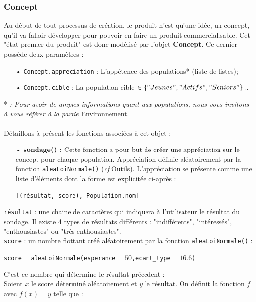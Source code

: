 \subsubsection{Concept}
\noindent
Au début de tout processus de création, le produit n'est qu'une idée, un concept, qu'il va falloir développer pour pouvoir en faire un produit commercialisable. Cet "état premier du produit" est donc modélisé par l'objet \textbf{Concept}. Ce dernier possède deux paramètres : 
	\begin{enumerate}
		\item[•] \texttt{Concept.appreciation} : L'appétence des populations* (liste de listes);
		\item[•] \texttt{Concept.cible} : La population cible $\in \left\{ "Jeunes", "Actifs", "Seniors"\right\}.$.\\ 
	\end{enumerate}
\noindent
* \textit{: Pour avoir de amples informations quant aux populations, nous vous invitons à vous référer à la partie} Environnement.\\\\
\noindent
Détaillons à présent les fonctions associées à cet objet :
\begin{enumerate}
	\item[•] \textbf{sondage() :} Cette fonction a pour but de créer une appréciation sur le concept pour chaque population. Appréciation définie aléatoirement par la fonction \texttt{aleaLoiNormale()} (\textit{cf} Outils). L'appréciation se présente comme une liste d'éléments dont la forme est explicitée ci-après :
	\begin{center}
		\texttt{[(résultat, score), Population.nom]}	
	\end{center}
\end{enumerate}
\noindent
\texttt{résultat} : une chaine de caractères qui indiquera à l'utilisateur le résultat du sondage. Il existe 4 types de résultats différents : "indifférents", "intéressés", "enthousiastes" ou "très enthousiastes".\\
\texttt{score} : un nombre flottant créé aléatoirement par la fonction \texttt{aleaLoiNormale()} :\\
\begin{center}
\texttt{score}$=$\texttt{aleaLoiNormale(esperance$=50$,ecart\_type$=16.6$)}
\end{center}
C'est ce nombre qui détermine le résultat précédent :\\
Soient $x$ le score déterminé aléatoirement et $y$ le résultat. On définit la fonction $f$ avec $f(x)=y$ telle que : \\\\
